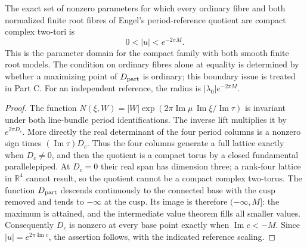 \begin{proposition}[B.1.2; Proved]\label{st:B.1.2}
The exact set of nonzero parameters for which every ordinary fibre and both normalized finite root fibres of Engel's period-reference quotient are compact complex two-tori is
\[
 0<|u|<e^{-2\pi M}.
\]
This is the parameter domain for the compact family with both smooth finite root models. The condition on ordinary fibres alone at equality is determined by whether a maximizing point of $D_{\rm part}$ is ordinary; this boundary issue is treated in Part C. For an independent reference, the radius is $|\lambda_0|e^{-2\pi M}$.
\end{proposition}
\begin{proof}
The function $N(\xi,W)=|W|\exp(2\pi\operatorname{Im}\mu\,\operatorname{Im}\xi/\operatorname{Im}\tau)$ is invariant under both line-bundle period identifications. The inverse lift multiplies it by $e^{2\pi D_c}$. More directly the real determinant of the four period columns is a nonzero sign times $(\operatorname{Im}\tau)D_c$. Thus the four columns generate a full lattice exactly when $D_c\ne0$, and then the quotient is a compact torus by a closed fundamental parallelepiped. At $D_c=0$ their real span has dimension three; a rank-four lattice in $\mathbb R^4$ cannot result, so the quotient cannot be a compact complex two-torus. The function $D_{\rm part}$ descends continuously to the connected base with the cusp removed and tends to $-\infty$ at the cusp. Its image is therefore $(-\infty,M]$: the maximum is attained, and the intermediate value theorem fills all smaller values. Consequently $D_c$ is nonzero at every base point exactly when $\operatorname{Im}c<-M$. Since $|u|=e^{2\pi\operatorname{Im}c}$, the assertion follows, with the indicated reference scaling.
\end{proof}

